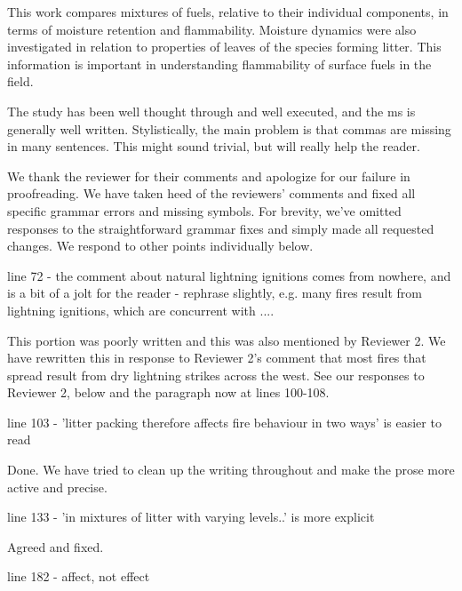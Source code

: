 \documentclass[letterpaper, 12pt]{letter}
\begin{document}
\begin{letter}{}
\begin{quoting}
  This work compares mixtures of fuels, relative to their individual
  components, in terms of moisture retention and flammability. Moisture
  dynamics were also investigated in relation to properties of leaves of the
  species forming litter. This information is important in understanding
  flammability of surface fuels in the field.

  The study has been well thought through and well executed, and the ms is
  generally well written. Stylistically, the main problem is that commas are
  missing in many sentences. This might sound trivial, but will really help the
  reader.
\end{quoting}

We thank the reviewer for their comments and apologize for our failure in
proofreading. We have taken heed of the reviewers' comments and fixed all
specific grammar errors and missing symbols. For brevity, we've omitted
responses to the straightforward grammar fixes and simply made all requested
changes. We respond to other points individually below.

\begin{quoting}
  line 72 - the comment about natural lightning ignitions comes from nowhere,
  and is a bit of a jolt for the reader - rephrase slightly, e.g. many fires
  result from lightning ignitions, which are concurrent with ....
\end{quoting}

This portion was poorly written and this was also mentioned by Reviewer 2. We
have rewritten this in response to Reviewer 2's comment that most fires that
spread result from dry lightning strikes across the west. See our responses to
Reviewer 2, below and the paragraph now at lines 100-108.

\begin{quoting}
  line 103 - 'litter packing therefore affects fire behaviour in two ways' is
  easier to read
\end{quoting}

Done. We have tried to clean up the writing throughout and make the prose more
active and precise.

\begin{quoting}
  line 133 - 'in mixtures of litter with varying levels..' is more explicit
\end{quoting}

Agreed and fixed.

\begin{quoting}
line 182 - affect, not effect
\end{quoting}


\end{letter}
\end{document}
